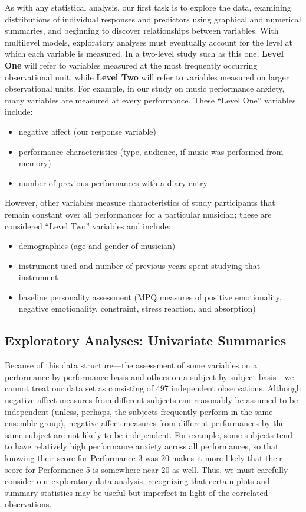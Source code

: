 \documentclass[
]{krantz}
\providecommand{\tightlist}{%
  \setlength{\itemsep}{0pt}\setlength{\parskip}{0pt}}
\begin{document}
As with any statistical analysis, our first task is to explore the data, examining distributions of individual responses and predictors using graphical and numerical summaries, and beginning to discover relationships between variables. With multilevel models, exploratory analyses must eventually account for the level at which each variable is measured. In a two-level study such as this one, \textbf{Level One}  will refer to variables measured at the most frequently occurring observational unit, while \textbf{Level Two} will refer to variables measured on larger observational units. For example, in our study on music performance anxiety, many variables are measured at every performance. These ``Level One'' variables include:

\begin{itemize}
\tightlist
\item
  negative affect (our response variable)
\item
  performance characteristics (type, audience, if music was performed from memory)
\item
  number of previous performances with a diary entry
\end{itemize}

However, other variables measure characteristics of study participants that remain constant over all performances for a particular musician; these are considered ``Level Two'' variables and include:

\begin{itemize}
\tightlist
\item
  demographics (age and gender of musician)
\item
  instrument used and number of previous years spent studying that instrument
\item
  baseline personality assessment (MPQ measures of positive emotionality, negative emotionality, constraint, stress reaction, and absorption)
\end{itemize}

\hypertarget{explore1}{%
\subsection{Exploratory Analyses: Univariate Summaries}\label{explore1}}

Because of this data structure---the assessment of some variables on a performance-by-performance basis and others on a subject-by-subject basis---we cannot treat our data set as consisting of 497 independent observations. Although negative affect measures from different subjects can reasonably be assumed to be independent (unless, perhaps, the subjects frequently perform in the same ensemble group), negative affect measures from different performances by the same subject are not likely to be independent. For example, some subjects tend to have relatively high performance anxiety across all performances, so that knowing their score for Performance 3 was 20 makes it more likely that their score for Performance 5 is somewhere near 20 as well. Thus, we must carefully consider our exploratory data analysis, recognizing that certain plots and summary statistics may be useful but imperfect in light of the correlated observations.
\end{document}
